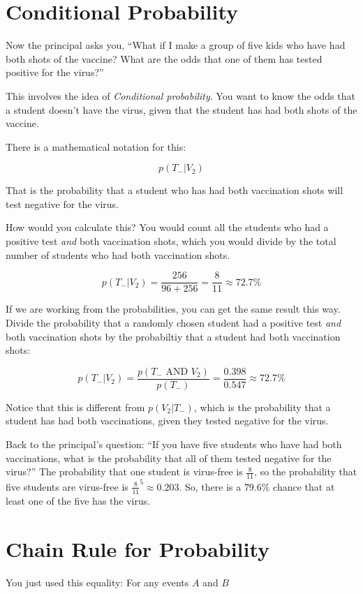 \section{Conditional Probability}
Now the principal asks you, ``What if I make a group of five kids who
have had both shots of the vaccine? What are the odds that one of them
has tested positive for the virus?''

This involves the idea of \textit{Conditional probability}.  You want
to know the odds that a student doesn't have the virus, given that
the student has had both shots of the vaccine.

There is a mathematical notation for this:

$$p(T_{-} | V_{2})$$

That is the probability that a student who has had both vaccination
shots will test negative for the virus.

How would you calculate this? You would count all the students who had
a positive test \textit{and} both vaccination shots, which you would
divide by the total number of students who had both vaccination shots.

$$p(T_{-} | V_{2}) = \frac{256}{96 + 256} = \frac{8}{11} \approx 72.7\%$$

If we are working from the probabilities, you can get the same result
this way. Divide the probability that a randomly chosen student had a
positive test \textit{and} both vaccination shots by the probabiltiy
that a student had both vaccination shots:

$$p(T_{-} | V_{2}) = \frac{p(T_{-} \text{ AND } V_{2})}{p(T_{-})} =  \frac{0.398}{0.547} \approx 72.7\%$$

Notice that this is different from $p( V_{2} | T_{-})$, which is the
probability that a student has had both vaccinations, given they
tested negative for the virus.

Back to the principal's question: ``If you have five students who have had
both vaccinations, what is the probability that all of them tested
negative for the virus?'' The probability that one student is virus-free
is $\frac{8}{11}$, so the probability that five students are virus-free
is $\frac{8}{11}^5 \approx 0.203$.  So, there is a $79.6\%$ chance
that at least one of the five has the virus.

\section{Chain Rule for Probability}
You just used this equality: For any events $A$ and $B$

